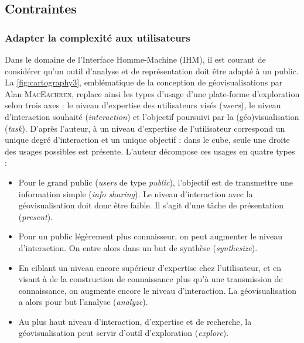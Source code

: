 \subsection{Contraintes}

\subsubsection{Adapter la complexité aux utilisateurs}

Dans le domaine de l'Interface Homme-Machine (IHM), il est courant de considérer qu'un outil d'analyse et de représentation doit être adapté à un public.
La \cref{fig:cartography3}, emblématique de la conception de géovisualisations par Alan \textsc{MacEachren}, replace ainsi les types d'usage d'une plate-forme d'exploration selon trois axes : le niveau d'expertise des utilisateurs visés (\textit{users}), le niveau d'interaction souhaité (\textit{interaction}) et l'objectif poursuivi par la (géo)visu\-alisation (\textit{task}).
D'après l'auteur, à un niveau d'expertise de l'utilisateur correspond un unique degré d'interaction et un unique objectif : dans le cube, seule une \og droite\fg{} des usages possibles est présente.
L'auteur décompose ces usages en quatre types :
\begin{itemize}
	\item Pour le grand public (\textit{users} de type \textit{public}), l'objectif est de transmettre une information simple (\textit{info sharing}). Le niveau d'interaction avec la géovisualisation doit donc être faible. Il s'agit d'une tâche de présentation (\textit{present}).
	\item Pour un public légèrement plus connaisseur, on peut augmenter le niveau d'interaction. On entre alors dans un but de synthèse (\textit{synthesize}).
	\item En ciblant un niveau encore supérieur d'expertise chez l'utilisateur, et en visant à de la construction de connaissance plus qu'à une transmission de connaissance, on augmente encore le niveau d'interaction.
	La géovisualisation a alors pour but l'analyse (\textit{analyze}).
	\item Au plus haut niveau d'interaction, d'expertise et de recherche, la géovisualisation peut servir d'outil d'exploration (\textit{explore}).
\end{itemize}

